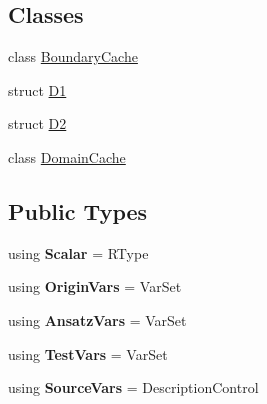 \subsection*{Classes}
\begin{DoxyCompactItemize}
\item 
class \hyperlink{classKaskade_1_1LinearModelPDE_1_1BoundaryCache}{Boundary\-Cache}
\item 
struct \hyperlink{structKaskade_1_1LinearModelPDE_1_1D1}{D1}
\item 
struct \hyperlink{structKaskade_1_1LinearModelPDE_1_1D2}{D2}
\item 
class \hyperlink{classKaskade_1_1LinearModelPDE_1_1DomainCache}{Domain\-Cache}
\end{DoxyCompactItemize}
\subsection*{Public Types}
\begin{DoxyCompactItemize}
\item 
\hypertarget{classKaskade_1_1LinearModelPDE_aa06f55cfd5f39f0e2b8b1e99740efbfa}{using {\bfseries Scalar} = R\-Type}\label{classKaskade_1_1LinearModelPDE_aa06f55cfd5f39f0e2b8b1e99740efbfa}

\item 
\hypertarget{classKaskade_1_1LinearModelPDE_aed8385e38e93f0c76fb9af5d8ac9752d}{using {\bfseries Origin\-Vars} = Var\-Set}\label{classKaskade_1_1LinearModelPDE_aed8385e38e93f0c76fb9af5d8ac9752d}

\item 
\hypertarget{classKaskade_1_1LinearModelPDE_aa0321c14344deb87c7cf0ab8b3f7918c}{using {\bfseries Ansatz\-Vars} = Var\-Set}\label{classKaskade_1_1LinearModelPDE_aa0321c14344deb87c7cf0ab8b3f7918c}

\item 
\hypertarget{classKaskade_1_1LinearModelPDE_a79217f844c54a877335ce23b6816afa9}{using {\bfseries Test\-Vars} = Var\-Set}\label{classKaskade_1_1LinearModelPDE_a79217f844c54a877335ce23b6816afa9}

\item 
\hypertarget{classKaskade_1_1LinearModelPDE_a35a85a83a256ca8f74a199559df39406}{using {\bfseries Source\-Vars} = Description\-Control}\label{classKaskade_1_1LinearModelPDE_a35a85a83a256ca8f74a199559df39406}

\end{DoxyCompactItemize}
